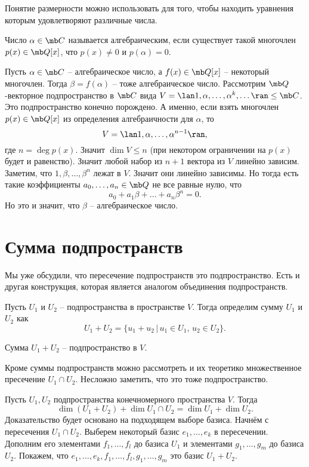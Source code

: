 Понятие размерности можно использовать для того, чтобы находить уравнения которым удовлетворяют различные числа.

\dfn Число $\alpha \in \mb C$ называется алгебраическим, если существует такой многочлен $p(x)\in \mb Q[x]$, что $p(x)\neq 0$ и $p(\alpha)=0$.
\edfn

\utv Пусть $\alpha \in \mb C$ -- алгебраическое число, а $f(x)\in \mb Q[x]$ -- некоторый многочлен. Тогда $\beta=f(\alpha)$ -- тоже алгебраическое число.
\eutv
\proof Рассмотрим $\mb Q$-векторное подпространство в $\mb C$ вида $V=\lan 1,\alpha,\dots,\alpha^k,\dots\ran \leq \mb C$. Это подпространство конечно порождено. А именно, если взять многочлен $p(x)\in \mb Q[x]$ из определения алгебраичности для $\alpha$, то 
$$V=\lan 1,\alpha,\dots, \alpha^{n-1}\ran,$$
где $n=\deg p(x)$. Значит $\dim V\leq n$ (при некотором ограничении на $p(x)$ будет и равенство). Значит любой набор из $n+1$ вектора из $V$ линейно зависим. Заметим, что $1,\beta,\dots,\beta^n$ лежат в $V$. Значит они линейно зависимы. Но тогда  есть такие коэффициенты $a_0,\dots,a_n\in \mb Q$ не все равные нулю, что $$a_0+a_1\beta+\dots+a_n\beta^n=0.$$
Но это и значит, что $\beta$ -- алгебраическое число. 
\endproof

\section{Сумма подпространств}

Мы уже обсудили, что пересечение подпространств это подпространство. Есть и другая конструкция, которая является аналогом объединения подпространств.

\dfn[Сумма] Пусть $U_1$ и $U_2$ -- подпространства в пространстве $V$. Тогда определим сумму $U_1$ и $U_2$ как 
$$U_1+U_2=\{u_1+u_2\,|\, u_1\in U_1, \,u_2\in U_2\}.$$
\edfn

\rm Сумма $U_1+U_2$ -- подпространство в $V$. \erm

\rm Кроме суммы подпространств можно рассмотреть и их теоретико множественное пресечение $U_1\cap U_2$. Несложно заметить, что это тоже подпространство. 
\erm

 Пусть $U_1,U_2$ подпространства конечномерного пространства  $V$. Тогда 
$$\dim (U_1+U_2) + \dim U_1\cap U_2 = \dim U_1 + \dim U_2.$$
\ethrm
\proof Доказательство будет основано на подходящем выборе базиса. Начнём с пересечения $U_1\cap U_2$. Выберем некоторый базис $e_1,\dots,e_k$ в пересечении. Дополним его элементами $f_1,\dots,f_l$ до базиса $U_1$ и элементами $g_1,\dots,g_m$ до базиса $U_2$. Покажем, что $e_1,\dots,e_k, f_1,\dots,f_l, g_1,\dots,g_m $ это базис $U_1+U_2$. 


